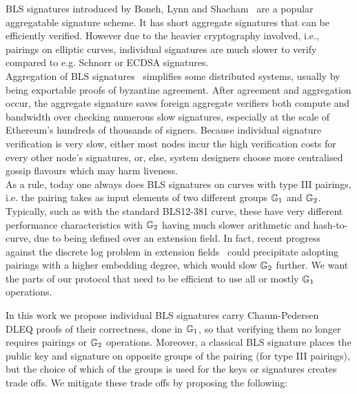 
BLS signatures introduced by Boneh, Lynn and Shacham~\cite{BLS_signatures} are a popular aggregatable signature scheme. 
It has short aggregate signatures that can be efficiently verified. However due to the heavier cryptography involved, i.e., 
pairings on elliptic curves, individual signatures are much slower to verify compared to e.g. Schnorr or ECDSA signatures. \\

Aggregation of BLS signatures~\cite{BLS_signatures} simplifies some distributed systems,
usually by being exportable proofs of byzantine agreement. After agreement and aggregation occur, 
the aggregate signature saves foreign aggregate verifiers both compute and bandwidth over checking
numerous slow signatures, especially at the scale of Ethereum's hundreds of thousands of signers.
Because individual signature verification is very slow, either most nodes incur the high verification 
costs for every other node's signatures, or, else, system designers choose more centralised gossip
flavours which may harm liveness. \\

As a rule, today one always does BLS signatures on curves with type III pairings,
i.e. the pairing takes as input elements of two different groups $\mathbb{G}_{1}$ and $\mathbb{G}_{2}$.
Typically, such as with the standard BLS12-381 curve, these have very different
performance characteristics with $\mathbb{G}_{2}$ having much slower arithmetic and hash-to-curve, due to
being defined over an extension field.  In fact, recent progress against the discrete log problem in 
extension fields~\cite{NumberFieldSieveAttack} could precipitate adopting pairings with a higher embedding degree, 
which would slow $\mathbb{G}_{2}$ further. We want the parts of our protocol that need to be 
efficient to use all or mostly $\mathbb{G}_{1}$ operations. \\

\begin{comment}
We suggest that gossip messages containing individual BLS signatures carry
a Chaum-Pedersen DLEQ proofs of their correctness, so that verifying
individual signatures no longer requires pairings.
%
We avoid complex bisection logic in aggregation this way too, but increase
signature message size by 32 bytes.
\end{comment}

In this work we propose individual BLS signatures carry Chaum-Pedersen~\cite{ChaumPedersen} DLEQ proofs of their correctness, done in $\mathbb{G}_{1}$, so that 
verifying them no longer requires pairings or $\mathbb{G}_{2}$ operations. Moreover, a classical BLS signature 
places the public key and signature on opposite groups of the pairing (for type III pairings), 
but the choice of which of the groups is used for the keys or signatures creates trade offs. 
We mitigate these trade offs by proposing the following:

